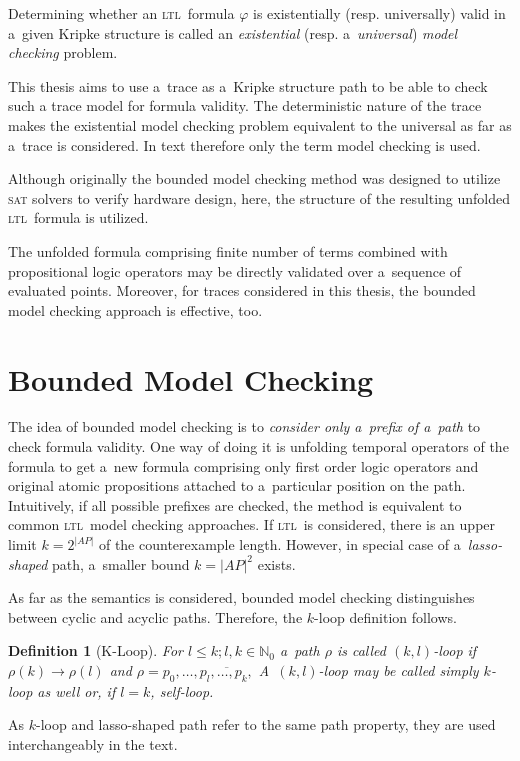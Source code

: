 \documentclass[12pt,twoside,draft]{fithesis}
\newcommand{\ltl}{\textsc{ltl}~}
\newcommand{\mNatural}{\mathbb{N}}
\newtheorem{mydef}{Definition}
\begin{document}
Determining whether an \ltl formula $\varphi$ is existentially (resp.
universally) valid in a~given Kripke structure is called an
\emph{existential} (resp. a~\emph{universal}) \emph{model checking}
problem\cite{biere}.

This thesis aims to use a~trace as a~Kripke structure path to be able
to check such a trace model for formula validity. The deterministic
nature of the trace makes the existential model checking problem
equivalent to the universal as far as a~trace is considered.
In text therefore only the term model checking is used.

Although originally\cite{biere} the bounded model checking method was
designed to utilize \textsc{sat} solvers to verify hardware design,
here, the structure of the resulting unfolded \ltl formula is utilized.

The unfolded formula comprising finite number of terms combined with
propositional logic operators may be directly validated over a~sequence
of evaluated points. Moreover, for traces considered in this thesis,
the bounded model checking approach is effective, too.

\section{Bounded Model Checking}
The idea of bounded model checking is to \emph{consider only a~prefix
of a~path} to check formula validity. One way of doing it is unfolding
temporal operators of the formula to get a~new formula comprising only
first order logic operators and original atomic propositions attached
to a~particular position on the path. Intuitively, if all possible
prefixes are checked, the method is equivalent to common \ltl model
checking approaches. If \ltl is considered, there is an upper
limit $k=2^{|AP|}$ of the counterexample length\cite{biere}. However, in
special case of a~\emph{lasso-shaped} path, a~smaller bound $k={|AP|}^2$
exists\cite{biere}.

As far as the semantics is considered, bounded model checking
distinguishes between cyclic and acyclic paths. Therefore, the $k$-loop
definition follows.
\begin{mydef}[K-Loop]
For $l\leq k;l,k\in\mNatural_0$ a~path $\rho$ is called $(k,l)$-loop
if $\rho(k)\rightarrow\rho(l)$ and
$\rho=p_0,\dotsc,\overline{p_{l},\dotsc,p_{k},}$
A~$(k,l)$-loop may be called simply $k$-loop as well or, if $l=k$,
self-loop.
\end{mydef}
As $k$-loop and lasso-shaped path refer to the same path property, they
are used interchangeably in the text.
\end{document}

